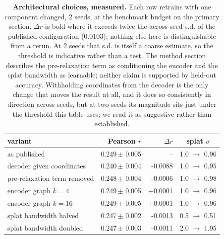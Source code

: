 \begin{table}[htbp]
\centering
\small
\caption{\textbf{Architectural choices, measured.} Each row retrains with one component changed, 2 seeds, at the benchmark budget on the primary section. $\Delta r$ is bold where it exceeds twice the across-seed s.d. of the published configuration (0.0103); nothing else here is distinguishable from a rerun. At 2 seeds that s.d. is itself a coarse estimate, so the threshold is indicative rather than a test. The method section describes the pre-relaxation term as conditioning the encoder and the splat bandwidth as learnable; neither claim is supported by held-out accuracy. Withholding coordinates from the decoder is the only change that moves the result at all, and it does so consistently in direction across seeds, but at two seeds its magnitude sits just under the threshold this table uses; we read it as suggestive rather than established.}
\label{tab:architecture}
\begin{tabular}{lrrc}
\toprule
variant & Pearson $r$ & $\Delta r$ & splat $\sigma$\\
\midrule
as published & 0.249\,\tiny{$\pm$ 0.005} & -- & 1.0 $\to$ 0.96 \\
decoder given coordinates & 0.240\,\tiny{$\pm$ 0.004} & -0.0088 & 1.0 $\to$ 0.95 \\
pre-relaxation term removed & 0.248\,\tiny{$\pm$ 0.004} & -0.0006 & 1.0 $\to$ 0.98 \\
encoder graph $k=4$ & 0.249\,\tiny{$\pm$ 0.005} & +0.0001 & 1.0 $\to$ 0.96 \\
encoder graph $k=16$ & 0.249\,\tiny{$\pm$ 0.005} & +0.0001 & 1.0 $\to$ 0.96 \\
splat bandwidth halved & 0.247\,\tiny{$\pm$ 0.002} & -0.0013 & 0.5 $\to$ 0.51 \\
splat bandwidth doubled & 0.247\,\tiny{$\pm$ 0.003} & -0.0011 & 2.0 $\to$ 1.95 \\
\bottomrule
\end{tabular}
\end{table}
